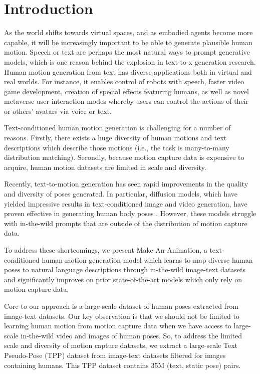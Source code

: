\documentclass[10pt,twocolumn,letterpaper]{article}
\begin{document}
\section{Introduction}
As the world shifts towards virtual spaces, and as embodied agents become more capable, it will be increasingly important to be able to generate plausible human motion. Speech or text are perhaps the most natural ways to prompt generative models, which is one reason behind the explosion in text-to-x generation research. Human motion generation from text has diverse applications both in virtual and real worlds. For instance, it enables control of robots with speech, faster video game development, creation of special effects featuring humans, as well as novel metaverse user-interaction modes whereby users can control the actions of their or others' avatars via voice or text. 

Text-conditioned human motion generation is challenging for a number of reasons. Firstly, there exists a huge diversity of human motions and text descriptions which describe those motions (i.e., the task is many-to-many distribution matching). Secondly, because motion capture data is expensive to acquire, human motion datasets are limited in scale and diversity. 

Recently, text-to-motion generation has seen rapid improvements in the quality and diversity of poses generated. In particular, diffusion models, which have yielded impressive results in text-conditioned image and video generation, have proven effective in generating human body poses \cite{tevet2022mdm, kim2022flame, zhang2022md}. However, these models struggle with in-the-wild prompts that are outside of the distribution of motion capture data. 

To address these shortcomings, we present Make-An-Animation, a text-conditioned human motion generation model which learns to map diverse human poses to natural language descriptions through in-the-wild image-text datasets and significantly improves on prior state-of-the-art models which only rely on motion capture data.

Core to our approach is a large-scale dataset of human poses extracted from image-text datasets. Our key observation is that we should not be limited to learning human motion from motion capture data when we have access to large-scale in-the-wild video and images of human poses. So, to address the limited scale and diversity of motion capture datasets, we extract a large-scale Text Pseudo-Pose (TPP) dataset from image-text datasets filtered for images containing humans. This TPP dataset contains 35M (text, static pose) pairs. 
\end{document}
